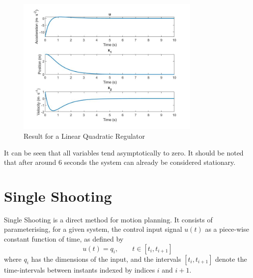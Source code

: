 
\begin{figure}[h!]
\centering
\includegraphics[width=0.8\textwidth]{Images/solution_lqr.jpg}
\caption{Result for a Linear Quadratic Regulator}
\label{fig:solution_lqr}
\end{figure}

\par It can be seen that all variables tend asymptotically to zero. It should be noted that after around 6 seconds the system can already be considered stationary.



\section{Single Shooting}

\par Single Shooting is a direct method for motion planning. It consists of parameterising, for a given system, the control input signal $u(t)$ as a piece-wise constant function of time, as defined by 
\begin{equation}
    \label{eq:single_shooting}
    u(t) = q_i, \qquad t\in [t_i,t_{i+1}]
\end{equation}
where $q_i$ has the dimensions of the input, and the intervals $[t_i,t_{i+1}]$ denote the time-intervals between instants indexed by indices $i$ and $i+1$.

